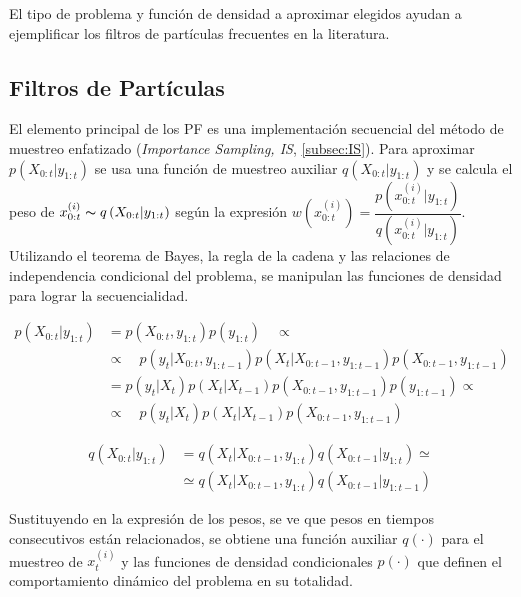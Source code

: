El tipo de problema y función de densidad a aproximar elegidos ayudan a ejemplificar los filtros de partículas frecuentes en la literatura.

\subsection{Filtros de Partículas} \label{sec:Filtros de Partículas}
El elemento principal de los PF es una implementación secuencial del método de muestreo enfatizado (\textit{Importance Sampling, IS}, \ref{subsec:IS}). Para aproximar $p\left(X_{0:t}|y_{1:t}\right)$ se usa una función de muestreo auxiliar $q\left(X_{0:t}|y_{1:t}\right)$ y se calcula el peso de $x_{0:t}^{(i)} \thicksim q\left(X_{0:t}|y_{1:t}\right)$ según la expresión $w\left(x_{0:t}^{(i)}\right) = \dfrac{p\left(x_{0:t}^{(i)}|y_{1:t}\right)}{q\left(x_{0:t}^{(i)}|y_{1:t}\right)}$. Utilizando el teorema de Bayes, la regla de la cadena y las relaciones de independencia condicional del problema, se manipulan las funciones de densidad para lograr la secuencialidad.

\begin{equation}
    \begin{aligned}
         p\left(X_{0:t}|y_{1:t}\right) &= p\left(X_{0:t},y_{1:t}\right)p\left(y_{1:t}\right) \quad \propto \\
         &\propto \quad p\left(y_{t}|X_{0:t},y_{1:t-1}\right)p\left(X_{t}|X_{0:t-1},y_{1:t-1}\right)p\left(X_{0:t-1},y_{1:t-1}\right) \\
         &= p\left(y_{t}|X_{t}\right)p\left(X_{t}|X_{t-1}\right)p\left(X_{0:t-1},y_{1:t-1}\right)p\left(y_{1:t-1}\right) \propto \\
         &\propto \quad p\left(y_{t}|X_{t}\right)p\left(X_{t}|X_{t-1}\right)p\left(X_{0:t-1},y_{1:t-1}\right)
    \end{aligned}
    \label{ec:3.9}
\end{equation}

\begin{equation}
    \begin{aligned}
        q\left(X_{0:t}|y_{1:t}\right) &= q\left(X_{t}|X_{0:t-1},y_{1:t}\right) q\left(X_{0:t-1}|y_{1:t}\right) \simeq \\
        &\simeq q\left(X_{t}|X_{0:t-1},y_{1:t}\right)q\left(X_{0:t-1}|y_{1:t-1}\right)
    \end{aligned}
    \label{ec:3.10}
\end{equation}

Sustituyendo en la expresión de los pesos, se ve que pesos en tiempos consecutivos están relacionados, se obtiene una función auxiliar $q(\cdot)$ para el muestreo de $x_{t}^{(i)}$ y las funciones de densidad condicionales $p(\cdot)$ que definen el comportamiento dinámico del problema en su totalidad.

